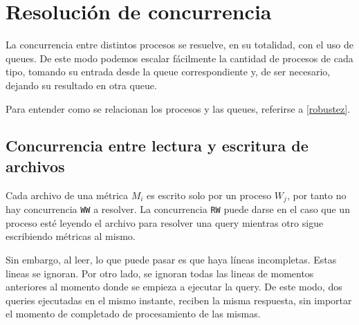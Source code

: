 \documentclass[titlepage,a4paper,oneside]{article}
\begin{document}
\section{Resolución de concurrencia}
La concurrencia entre distintos procesos se resuelve, en su totalidad, con el uso de queues. De este modo podemos escalar fácilmente la cantidad de procesos de cada tipo, tomando su entrada desde la queue correspondiente y, de ser necesario, dejando su resultado en otra queue.

Para entender como se relacionan los procesos y las queues, referirse a \ref{robustez}.

\subsection{Concurrencia entre lectura y escritura de archivos}
Cada archivo de una métrica $M_i$ es escrito solo por un proceso $W_j$, por tanto no hay concurrencia \texttt{WW} a resolver. La concurrencia \texttt{RW} puede darse en el caso que un proceso esté leyendo el archivo para resolver una query mientras otro sigue escribiendo métricas al mismo.

Sin embargo, al leer, lo que puede pasar es que haya líneas incompletas. Estas lineas se ignoran. Por otro lado, se ignoran todas las lineas de momentos anteriores al momento donde se empieza a ejecutar la query. De este modo, dos queries ejecutadas en el mismo instante, reciben la misma respuesta, sin importar el momento de completado de procesamiento de las mismas.

\printbibliography
\end{document}
